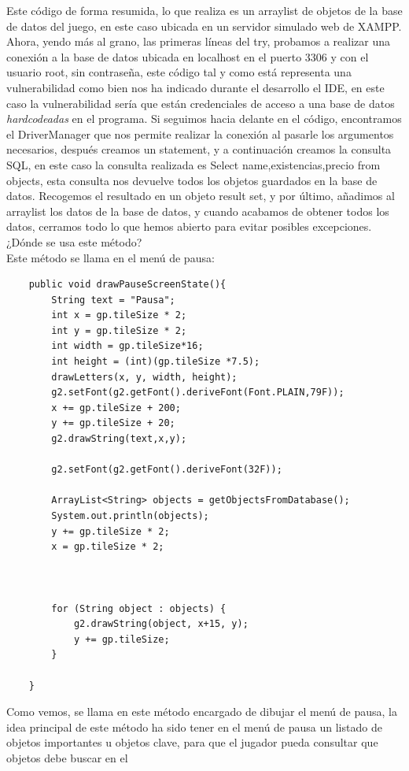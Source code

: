 \documentclass[a4paper]{article}
\begin{document}
Este código de forma resumida, lo que realiza es un arraylist de objetos de la base de datos del juego, en este caso ubicada en un servidor simulado web de XAMPP.\\
Ahora, yendo más al grano, las primeras líneas del try, probamos a realizar una conexión a la base de datos ubicada en localhost en el puerto 3306 y con el usuario root, sin contraseña, este código tal y como está representa una
vulnerabilidad como bien nos ha indicado durante el desarrollo el IDE, en este caso la vulnerabilidad sería que están credenciales de acceso a una base de datos \textit{hardcodeadas} en el programa.
Si seguimos hacia delante en el código, encontramos el DriverManager que nos permite realizar la conexión al pasarle los argumentos necesarios, después creamos un statement, y a continuación creamos la consulta SQL,
en este caso la consulta realizada es Select name,existencias,precio from objects, esta consulta nos devuelve todos los objetos guardados en la base de datos. Recogemos el resultado en un objeto result set, y por último,
añadimos al arraylist los datos de la base de datos, y cuando acabamos de obtener todos los datos, cerramos todo lo que hemos abierto para evitar posibles excepciones.\\
¿Dónde se usa este método?\\
Este método se llama en el menú de pausa:
\begin{lstlisting}
    public void drawPauseScreenState(){
        String text = "Pausa";
        int x = gp.tileSize * 2;
        int y = gp.tileSize * 2;
        int width = gp.tileSize*16;
        int height = (int)(gp.tileSize *7.5);
        drawLetters(x, y, width, height);
        g2.setFont(g2.getFont().deriveFont(Font.PLAIN,79F));
        x += gp.tileSize + 200;
        y += gp.tileSize + 20;
        g2.drawString(text,x,y);

        g2.setFont(g2.getFont().deriveFont(32F));

        ArrayList<String> objects = getObjectsFromDatabase();
        System.out.println(objects);
        y += gp.tileSize * 2;
        x = gp.tileSize * 2;



        for (String object : objects) {
            g2.drawString(object, x+15, y);
            y += gp.tileSize;
        }

    }
\end{lstlisting}
Como vemos, se llama en este método encargado de dibujar el menú de pausa, la idea principal de este método ha sido tener en el menú de pausa un listado de objetos importantes u objetos clave, para que el jugador pueda consultar que objetos debe buscar en el
\end{document}
